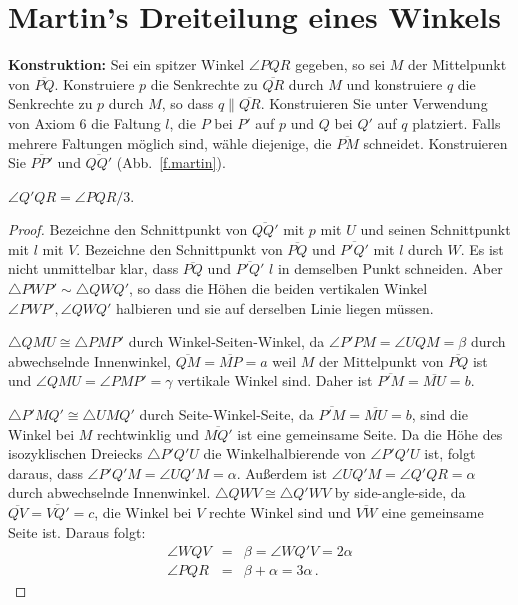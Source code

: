 
\section{Martin's Dreiteilung eines Winkels}\label{s.martin-trisection}

\noindent\textbf{Konstruktion:}
Sei ein spitzer Winkel $\angle PQR$ gegeben, so sei $M$ der Mittelpunkt von $\overline{PQ}$. Konstruiere $p$ die Senkrechte zu $\overline{QR}$ durch $M$ und konstruiere $q$ die Senkrechte zu $p$ durch $M$, so dass $q\parallel\overline{QR}$. Konstruieren Sie unter Verwendung von Axiom 6 die Faltung $l$, die $P$ bei $P'$ auf $p$ und $Q$ bei $Q'$ auf $q$ platziert. Falls mehrere Faltungen möglich sind, wähle diejenige, die $\overline{PM}$ schneidet. Konstruieren Sie $\overline{PP'}$ und $\overline{QQ'}$ (Abb.~\ref{f.martin}).

\begin{theorem}
$\angle Q'QR=\angle PQR/3$.
\end{theorem}
\begin{proof}
Bezeichne den Schnittpunkt von $\overline{QQ'}$ mit $p$ mit $U$ und seinen Schnittpunkt mit $l$ mit $V$. Bezeichne den Schnittpunkt von $\overline{PQ}$ und $\overline{P'Q'}$ mit $l$ durch $W$. Es ist nicht unmittelbar klar, dass $\overline{PQ}$ und $\overline{P'Q'}$ $l$ in demselben Punkt schneiden. Aber $\triangle PWP' \sim \triangle QWQ'$, so dass die Höhen die beiden vertikalen Winkel $\angle PWP', \angle QWQ'$ halbieren und sie auf derselben Linie liegen müssen.

$\triangle QMU\cong \triangle PMP'$ durch Winkel-Seiten-Winkel, da $\angle P'PM=\angle UQM=\beta$ durch abwechselnde Innenwinkel, $\overline{QM}=\overline{MP}=a$ weil $M$ der Mittelpunkt von $\overline{PQ}$ ist und $\angle QMU=\angle PMP'=\gamma$ vertikale Winkel sind. Daher ist $\overline{P'M}=\overline{MU}=b$.

$\triangle P'MQ'\cong \triangle UMQ'$ durch Seite-Winkel-Seite, da $\overline{P'M}=\overline{MU}=b$, sind die Winkel bei $M$ rechtwinklig und $\overline{MQ'}$ ist eine gemeinsame Seite. Da die Höhe des isozyklischen Dreiecks $\triangle P'Q'U$ die Winkelhalbierende von $\angle P'Q'U$ ist, folgt daraus, dass $\angle P'Q'M=\angle UQ'M=\alpha$. Außerdem ist $\angle UQ'M=\angle Q'QR=\alpha$ durch abwechselnde Innenwinkel. $\triangle QWV\cong\triangle Q'WV$ by side-angle-side, da $\overline{QV}=\overline{VQ'}=c$, die Winkel bei $V$ rechte Winkel sind und $\overline{VW}$ eine gemeinsame Seite ist. Daraus folgt:
\begin{eqnarray*}
\angle WQV&=&\beta=\angle WQ'V=2\alpha\\
\angle PQR &=& \beta + \alpha = 3\alpha\,.
\end{eqnarray*}
\end{proof}

